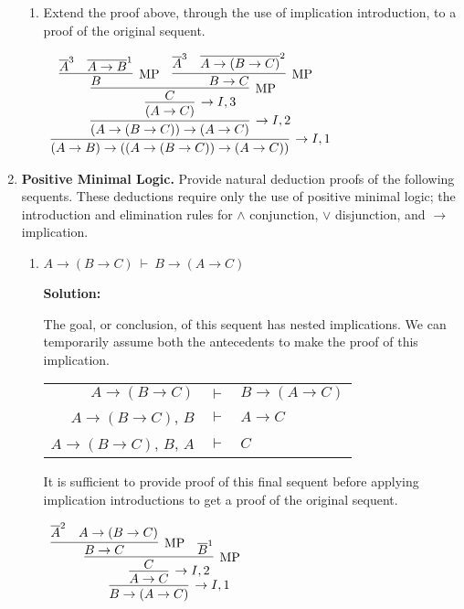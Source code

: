 \documentclass[11pt]{report}
\newcommand{\temp}[2]{{\overline{#2}}^{#1}}
\begin{document}
\begin{enumerate}
\begin{enumerate}
		\item Extend the proof above, through the use of implication introduction, to a proof of the original sequent.
		
		\begin{center}
			$\begin{array}{c}
				\infer[\to I,1]{(A \to B) \to ((A \to (B \to C)) \to (A \to C))}
					{\infer[\to I,2]{(A \to (B \to C)) \to (A \to C)}
						{\infer[\to I,3]{(A \to C)}
							{\infer[\MP]{C}
								{\infer[\MP]{B}
									{\overline{A}^{3} & \temp{1}{A \to B}} & 
								\infer[\MP]{B \to C}
									{\temp{3}{A} & \temp{2}{A \to (B \to C)}}}}}}
			\end{array}$
		\end{center}

	\end{enumerate}
	
	\newpage
	\item \textbf{Positive Minimal Logic.} Provide natural deduction proofs of the following sequents. These deductions require only the use of positive minimal logic; the introduction and elimination rules for $\land$ conjunction, $\lor$ disjunction, and $\to$ implication. 
	 
	\begin{enumerate}
		\item $A \to (B \to C) \ \vdash \ B \to (A \to C)$ 
		
		\vspace{5mm}
		\textbf{Solution:}

		The goal, or conclusion, of this sequent has nested implications. We can temporarily assume both the antecedents to make the proof of this implication. 

		\begin{center}
			\begin{tabular}{r c l}
				$A \to (B \to C)$ & $\vdash$ & $B \to (A \to C)$ \\
				$A \to (B \to C)$, $B$ & $\vdash$ & $A \to C$ \\
				$A \to (B \to C)$, $B$, $A$ & $\vdash$ & $C$ \\
			\end{tabular}
		\end{center}

		It is sufficient to provide proof of this final sequent before applying implication introductions to get a proof of the original sequent. 

		\begin{center}
			$\begin{array}{c}
				\infer[\to I, 1]{B \to (A \to C)}
					{\infer[\to I, 2]{A \to C}
						{\infer[\MP]{C}
							{\infer[\MP]{B \to C}
								{\temp{2}{A}
									&
								 A \to (B \to C)}
								&
								\temp{1}{B}}}}
			\end{array}$
		\end{center}


\end{enumerate}
\end{enumerate}
\end{document}
